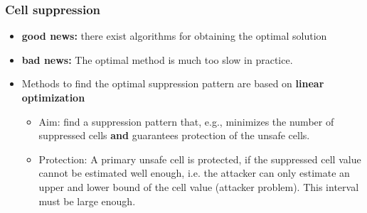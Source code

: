 \begin{frame}\frametitle{Cell suppression}
	\begin{itemize}
		\item {\bf good news:} there exist algorithms for obtaining the optimal solution \pause
		\item {\bf bad news:} The optimal method is much too slow in practice.\pause
		\item Methods to find the optimal suppression pattern are based on {\bf linear optimization} \pause
		\begin{itemize}
			\item Aim: find a suppression pattern that, e.g.,  minimizes  the number of suppressed cells \textbf{and} guarantees protection of the unsafe cells.\pause
			\item Protection: A primary unsafe cell is protected, if the suppressed cell value cannot be estimated well enough, i.e. the attacker can only estimate an upper and lower bound of the cell value (attacker problem). This interval must be large enough. \pause
		\end{itemize}
	\end{itemize}
\end{frame}

